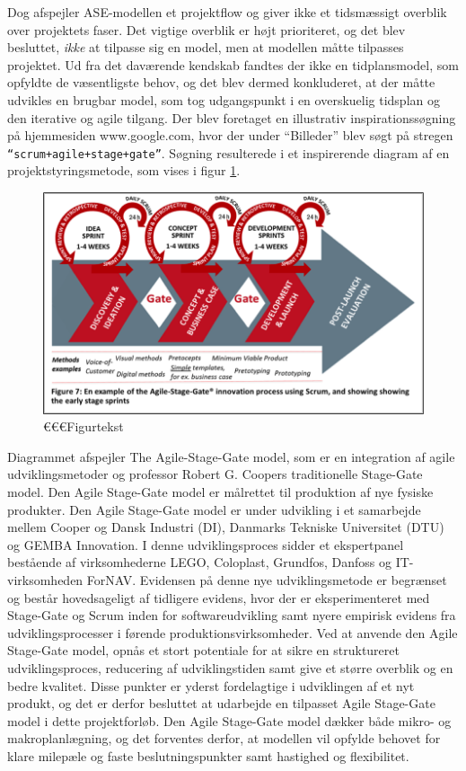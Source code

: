 	 Dog afspejler ASE-modellen et projektflow og  giver ikke et tidsmæssigt overblik over projektets faser. Det vigtige overblik er højt prioriteret, og det blev besluttet, \textit{ikke} at tilpasse sig en model, men at modellen måtte tilpasses projektet. Ud fra det daværende kendskab fandtes der ikke en tidplansmodel, som opfyldte de væsentligste behov, og det blev dermed konkluderet, at der måtte udvikles en brugbar model, som tog udgangspunkt i en overskuelig tidsplan og den iterative og agile tilgang. Der blev foretaget en illustrativ inspirationssøgning på hjemmesiden www.google.com, hvor der under “Billeder” blev søgt på stregen \texttt{“scrum+agile+stage+gate”}. Søgning resulterede i et inspirerende diagram af en projektstyringsmetode, som vises i figur \ref{fig:inspidia}.  
	
	\begin{figure}[htb]
		\centering
		\includegraphics[width=5in]{inspirerendediagram}
		\caption{€€€Figurtekst}
		\label{fig:inspidia}	
	\end{figure}

	Diagrammet afspejler The Agile-Stage-Gate model, som er en integration af agile udviklingsmetoder og professor Robert G. Coopers traditionelle Stage-Gate model. Den Agile Stage-Gate model er målrettet til produktion af nye fysiske produkter. Den Agile Stage-Gate model er under udvikling i et samarbejde mellem Cooper og Dansk Industri (DI), Danmarks Tekniske Universitet (DTU) og GEMBA Innovation. I denne udviklingsproces sidder et ekspertpanel bestående af virksomhederne LEGO, Coloplast, Grundfos, Danfoss og IT-virksomheden ForNAV. Evidensen på denne nye udviklingsmetode er begrænset og består hovedsageligt af tidligere evidens, hvor der er eksperimenteret med Stage-Gate og Scrum inden for softwareudvikling samt nyere empirisk evidens fra udviklingsprocesser i førende produktionsvirksomheder. Ved at anvende den Agile Stage-Gate model, opnås et stort potentiale for at sikre en struktureret udviklingsproces, reducering af udviklingstiden samt give et større overblik og en bedre kvalitet. Disse punkter er yderst fordelagtige i udviklingen af et nyt produkt, og det er derfor besluttet at udarbejde en tilpasset Agile Stage-Gate model i dette projektforløb. Den Agile Stage-Gate model dækker både mikro- og makroplanlægning, og det forventes derfor, at modellen vil opfylde behovet for klare milepæle og faste beslutningspunkter samt hastighed og flexibilitet. 
	   
